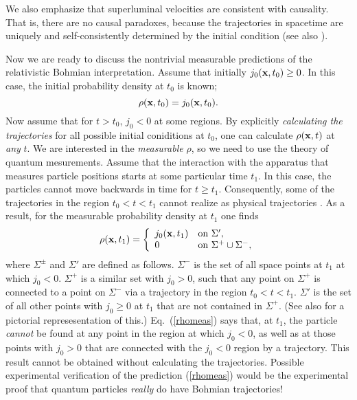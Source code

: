 \documentclass[12pt]{article} %
\begin{document}
We also emphasize that
superluminal velocities are consistent with causality.
That is, there are no causal paradoxes, because
the trajectories in spacetime are uniquely and self-consistently 
determined by the initial condition (see also \cite{nikolcaus}). 

Now we are ready to discuss the nontrivial measurable predictions of 
the relativistic Bohmian interpretation. 
Assume that initially
$j_0({\bf x},t_0)\geq 0$. In this case,
the initial probability density at $t_0$ is known;
\begin{equation}
\rho({\bf x},t_0)=j_0({\bf x},t_0) .
\end{equation}
Now assume that for $t>t_0$, $j_0<0$ at some regions. 
By explicitly {\em calculating the trajectories} for all possible 
initial coniditions at $t_0$, one can calculate 
$\rho({\bf x},t)$ at {\em any} $t$.  
We are interested in the {\em measurable} $\rho$, so we need to use 
the theory of quantum mesurements. 
Assume that the interaction with the apparatus that 
measures particle positions 
starts at some particular time $t_1$. 
In this case, the particles cannot move backwards in time 
for $t\geq t_1$. Consequently, some of the trajectories 
in the region $t_0<t<t_1$ cannot realize as physical trajectories
\cite{nikolfpl3}. As a result, for the measurable probability 
density at $t_1$ one finds \cite{nikolfpl3} 
\begin{equation}\label{rhomeas}
\rho({\bf x},t_1)=\left\{  
\begin{array}{ll}
j_0({\bf x},t_1) & \mbox{on $\Sigma'$}, \\
0 & \mbox{on $\Sigma^+\cup\Sigma^-$},
\end{array}   
\right.
\end{equation}
where $\Sigma^{\pm}$ and $\Sigma'$ are defined as follows.
$\Sigma^-$ is the set of all space points at $t_1$ at which 
$j_0<0$. $\Sigma^+$ is a similar set with $j_0>0$, such that
any point on $\Sigma^+$ is connected to a point on $\Sigma^-$   
via a trajectory in the region $t_0<t<t_1$. $\Sigma'$ is the 
set of all other points with $j_0\geq 0$ at $t_1$ that are 
not contained in $\Sigma^+$. (See also \cite{nikolfpl3} for a 
pictorial represesentation of this.) 
Eq.~(\ref{rhomeas}) says that,
at $t_1$, the particle {\em cannot} be found at 
any point in the region at which $j_0<0$, as well as at 
those points with $j_0>0$ that are connected 
with the $j_0<0$ region by a trajectory. 
This result cannot be obtained without 
calculating the trajectories. 
Possible experimental verification of the prediction (\ref{rhomeas})
would be 
the experimental proof that quantum particles {\em really} do have 
Bohmian trajectories!
\end{document}
